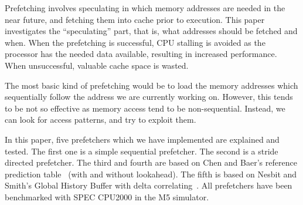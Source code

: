 Prefetching involves speculating in which memory addresses are needed
in the near future, and fetching them into cache prior to
execution. This paper investigates the ``speculating'' part, that is,
what addresses should be fetched and when. When the prefetching is
successful, CPU stalling is avoided as the processor has the needed
data available, resulting in increased performance. When unsuccessful,
valuable cache space is wasted.

The most basic kind of prefetching would be to load the memory
addresses which sequentially follow the address we are currently
working on. However, this tends to be not so effective as memory
access tend to be non-sequential. Instead, we can look for access
patterns, and try to exploit them.

In this paper, five prefetchers which we have implemented are
explained and tested. The first one is a simple sequential
prefetcher. The second is a stride directed prefetcher. The third and
fourth are based on Chen and Baer's reference prediction
table~\cite{chen_baer_1995} (with and without lookahead). The fifth is
based on Nesbit and Smith's Global History Buffer with delta
correlating~\cite{nesbit_smith_2005}. All prefetchers have been
benchmarked with SPEC CPU2000 in the M5 simulator.


